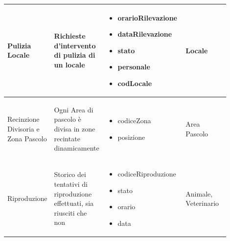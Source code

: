 \documentclass[12pt,a4paper]{article}
\begin{document}
\begin{center}
\begin{longtable}{|p{0.14\linewidth}|p{0.20\linewidth}|p{0.36\linewidth}|p{0.20\linewidth}|}
\hline
Pulizia Locale 		& \begin{flushleft}\vspace{-25pt} Richieste d'intervento di pulizia di un locale \end{flushleft}
					& \begin{itemize}
						\setlength{\itemindent}{-1em}
						\vspace{-25pt}
						\setlength\itemsep{-0.25em}
						\item orarioRilevazione
						\item dataRilevazione
						\item stato
						\item personale
						\item codLocale
					\end{itemize}
					& \begin{flushleft}\vspace{-25pt} Locale \end{flushleft}\\

\hline
Recinzione Divisoria e Zona Pascolo & \begin{flushleft}\vspace{-25pt} Ogni Area di pascolo è divisa in zone recintate dinamicamente \end{flushleft}
					& \begin{itemize}
						\setlength{\itemindent}{-1em}
						\vspace{-25pt}
						\setlength\itemsep{-0.25em}
						\item codiceZona
						\item posizione
						 
					\end{itemize}
					& \begin{flushleft}\vspace{-25pt} Area Pascolo \end{flushleft}\\

\hline
Riproduzio\-ne 		& \begin{flushleft}\vspace{-25pt} Storico dei tentativi di riproduzione effettuati, sia riusciti che non \end{flushleft}
					& \begin{itemize}
						\setlength{\itemindent}{-1em}
						\vspace{-25pt}
						\setlength\itemsep{-0.25em}
						\item codiceRiproduzione
						\item stato
						\item orario
						\item data
					\end{itemize}
					& \begin{flushleft}\vspace{-25pt} Animale, Veterinario \end{flushleft}\\


\end{longtable}
\end{center}
\end{document}

